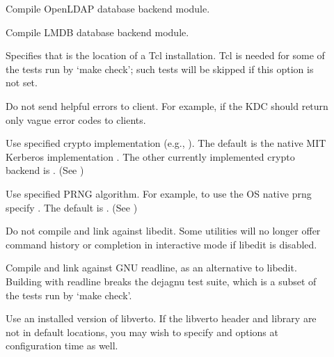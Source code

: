 \documentclass[letterpaper,10pt,english]{sphinxmanual}
\begin{document}
\begin{description}
\item[{\sphinxstylestrong{-}}] \leavevmode
Compile OpenLDAP database backend module.

\item[{\sphinxstylestrong{-}}] \leavevmode
Compile LMDB database backend module.

\item[{\sphinxstylestrong{-}}] \leavevmode
Specifies that  is the location of a Tcl installation.
Tcl is needed for some of the tests run by ‘make check’; such tests
will be skipped if this option is not set.

\item[{\sphinxstylestrong{-}}] \leavevmode
Do not send helpful errors to client.  For example, if the KDC
should return only vague error codes to clients.

\item[{\sphinxstylestrong{-}}] \leavevmode
Use specified crypto implementation (e.g., \sphinxstylestrong{-}).  The default is the native MIT
Kerberos implementation .  The other currently
implemented crypto backend is .  (See
)

\item[{\sphinxstylestrong{-}}] \leavevmode
Use specified PRNG algorithm.  For example, to use the OS native
prng specify .  The default is .
(See )

\item[{\sphinxstylestrong{-}}] \leavevmode
Do not compile and link against libedit.  Some utilities will no
longer offer command history or completion in interactive mode if
libedit is disabled.

\item[{\sphinxstylestrong{-}}] \leavevmode
Compile and link against GNU readline, as an alternative to libedit.
Building with readline breaks the dejagnu test suite, which is a
subset of the tests run by ‘make check’.

\item[{\sphinxstylestrong{-}}] \leavevmode
Use an installed version of libverto.  If the libverto header and
library are not in default locations, you may wish to specify
 and  options
at configuration time as well.


\end{description}
\end{document}
